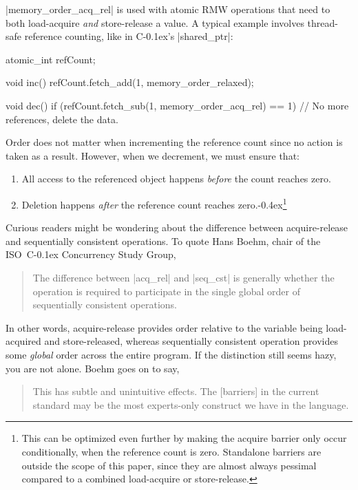 \documentclass[fontsize=10pt, oneside]{scrartcl}
\newcommand{\punckern}{\kern-0.4ex}
\newcommand{\cplusplus}[1]{C\kern-0.1ex\raisebox{0.15ex}{\texttt{++}}#1}
\begin{document}
\cc|memory_order_acq_rel| is used with atomic \textsc{RMW} operations that need to both load-acquire \emph{and} store-release a value.
A typical example involves thread-safe reference counting,
like in \cplusplus{}'s \cpp|shared_ptr|:
\begin{cppcode}
atomic_int refCount;

void inc()
{
    refCount.fetch_add(1, memory_order_relaxed);
}
\end{cppcode}
\begin{cppcode}
void dec()
{
    if (refCount.fetch_sub(1, memory_order_acq_rel) == 1) {
        // No more references, delete the data.
    }
}
\end{cppcode}

Order does not matter when incrementing the reference count since no action is taken as a result.
However, when we decrement, we must ensure that:
\begin{enumerate}
  \item All access to the referenced object happens \emph{before} the count reaches zero.
  \item Deletion happens \emph{after} the reference count reaches zero.\punckern\footnote{%
        This can be optimized even further by making the acquire barrier only occur conditionally,
        when the reference count is zero.
        Standalone barriers are outside the scope of this paper,
        since they are almost always pessimal compared to a combined load-acquire or store-release.}
\end{enumerate}

Curious readers might be wondering about the difference between acquire-release and sequentially consistent operations.
To quote Hans Boehm, chair of the ISO~\cplusplus{} Concurrency Study Group,
\begin{quote}
\small
The difference between \cc|acq_rel| and \cc|seq_cst| is generally whether the operation is required to participate in the single global order of sequentially consistent operations.
\end{quote}
In other words, acquire-release provides order relative to the variable being load-acquired and store-released,
whereas sequentially consistent operation provides some \emph{global} order across the entire program.
If the distinction still seems hazy, you are not alone.
Boehm goes on to say,
\begin{quote}
\small
This has subtle and unintuitive effects.
The [barriers] in the current standard may be the most
experts-only construct we have in the language.
\end{quote}
\end{document}
